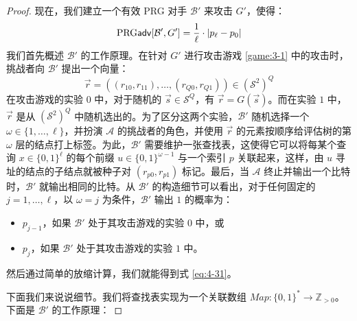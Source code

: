 \begin{proof}
现在，我们建立一个有效 PRG 对手 $\mathcal{B}'$ 来攻击 $G'$，使得：
\begin{equation}\label{eq:4-31}
{\rm PRG\mathsf{adv}}[\mathcal{B}',G']=\frac{1}{\ell}\cdot|p_\ell-p_0|
\end{equation}
我们首先概述 $\mathcal{B}'$ 的工作原理。在针对 $G'$ 进行攻击游戏 \ref{game:3-1} 中的攻击时，挑战者向 $\mathcal{B}'$ 提出一个向量：
\begin{equation}\label{eq:4-32}
\vec{r}=((r_{10},r_{11}),\dots,(r_{Q0},r_{Q1}))\in(\mathcal{S}^2)^Q
\end{equation}
在攻击游戏的实验 $0$ 中，对于随机的 $\vec{s}\in\mathcal{S}^Q$，有 $\vec{r}=G(\vec{s})$。而在实验 $1$ 中，$\vec{r}$ 是从 $(\mathcal{S}^2)^Q$ 中随机选出的。为了区分这两个实验，$\mathcal{B}'$ 随机选择一个 $\omega\in\{1,\dots,\ell\}$，并扮演 $\mathcal{A}$ 的挑战者的角色，并使用 $\vec r$ 的元素按顺序给评估树的第 $\omega$ 层的结点打上标签。为此，$\mathcal{B}'$ 需要维护一张查找表，这使得它可以将每某个查询 $x\in\{0,1\}^\ell$ 的每个前缀 $u\in\{0,1\}^{\omega-1}$ 与一个索引 $p$ 关联起来，这样，由 $u$ 寻址的结点的子结点就被种子对 $(r_{p0},r_{p1})$ 标记。最后，当 $\mathcal{A}$ 终止并输出一个比特时，$\mathcal{B}'$ 就输出相同的比特。从 $\mathcal{B}'$ 的构造细节可以看出，对于任何固定的 $j=1,\dots,\ell$，以 $\omega=j$ 为条件，$\mathcal{B}'$ 输出 $1$ 的概率为：
\begin{itemize}
	\item $p_{j-1}$，如果 $\mathcal{B}'$ 处于其攻击游戏的实验 $0$ 中，或
	\item $p_j$，如果 $\mathcal{B}'$ 处于其攻击游戏的实验 $1$ 中。
\end{itemize}
然后通过简单的放缩计算，我们就能得到式 \ref{eq:4-31}。

下面我们来说说细节。我们将查找表实现为一个关联数组 $Map:\{0,1\}^*\to\mathbb{Z}_{>0}$。下面是 $\mathcal{B}'$ 的工作原理：

\vspace{5pt}


\end{proof}
